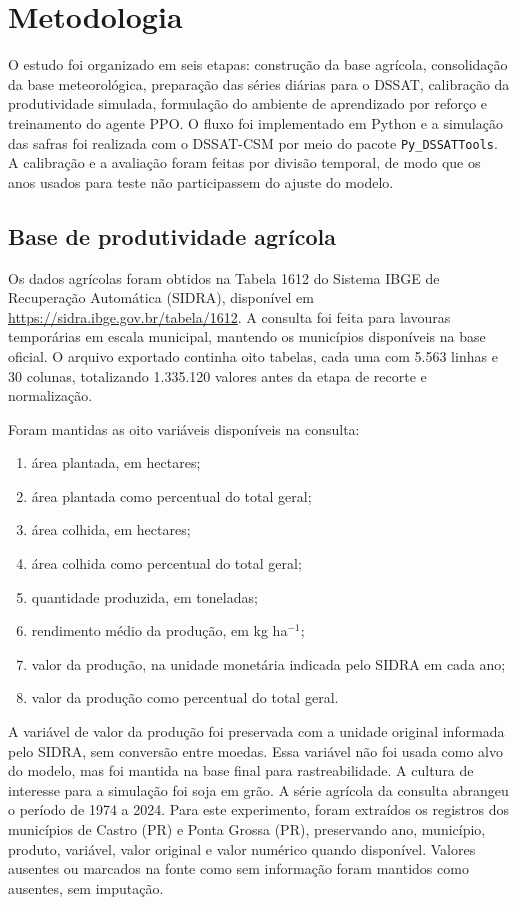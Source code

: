 \section{Metodologia}
\label{sec:metodologia}

O estudo foi organizado em seis etapas: construção da base agrícola, consolidação
da base meteorológica, preparação das séries diárias para o DSSAT, calibração da
produtividade simulada, formulação do ambiente de aprendizado por reforço e
treinamento do agente PPO. O fluxo foi implementado em Python e a simulação das
safras foi realizada com o DSSAT-CSM por meio do pacote
\texttt{Py\_DSSATTools}. A calibração e a avaliação foram feitas por divisão
temporal, de modo que os anos usados para teste não participassem do ajuste do
modelo.

\subsection{Base de produtividade agrícola}
\label{subsec:base_produtividade}

Os dados agrícolas foram obtidos na Tabela 1612 do Sistema IBGE de Recuperação
Automática (SIDRA), disponível em
\url{https://sidra.ibge.gov.br/tabela/1612}. A consulta foi feita para lavouras
temporárias em escala municipal, mantendo os municípios disponíveis na base
oficial. O arquivo exportado continha oito tabelas, cada uma com 5.563 linhas e
30 colunas, totalizando 1.335.120 valores antes da etapa de recorte e
normalização.

Foram mantidas as oito variáveis disponíveis na consulta:
\begin{enumerate}
    \item área plantada, em hectares;
    \item área plantada como percentual do total geral;
    \item área colhida, em hectares;
    \item área colhida como percentual do total geral;
    \item quantidade produzida, em toneladas;
    \item rendimento médio da produção, em kg ha$^{-1}$;
    \item valor da produção, na unidade monetária indicada pelo SIDRA em cada ano;
    \item valor da produção como percentual do total geral.
\end{enumerate}

A variável de valor da produção foi preservada com a unidade original informada
pelo SIDRA, sem conversão entre moedas. Essa variável não foi usada como alvo do
modelo, mas foi mantida na base final para rastreabilidade. A cultura de
interesse para a simulação foi soja em grão. A série agrícola da consulta
abrangeu o período de 1974 a 2024. Para este experimento, foram extraídos os
registros dos municípios de Castro (PR) e Ponta Grossa (PR), preservando ano,
município, produto, variável, valor original e valor numérico quando disponível.
Valores ausentes ou marcados na fonte como sem informação foram mantidos como
ausentes, sem imputação.

